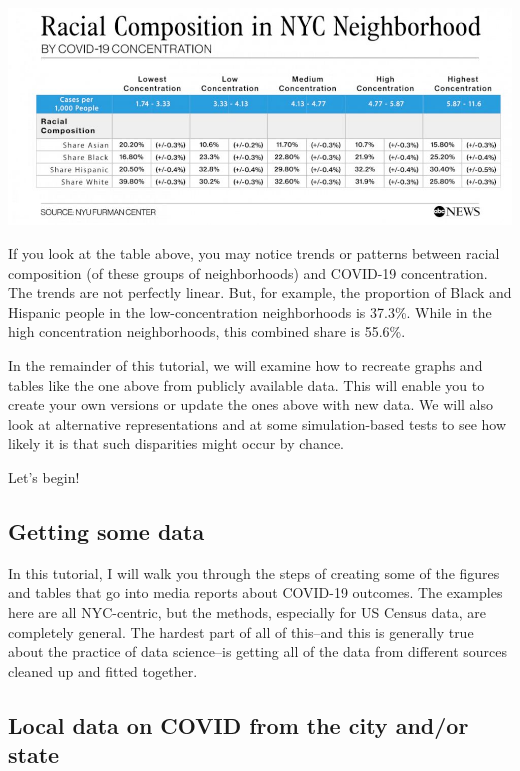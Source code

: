 \documentclass[
  openany]{book}
\begin{document}
\includegraphics{images/abc_COVID19RacialComp_v02_KA_hpEmbed_37x16_992.jpg}

If you look at the table above, you may notice trends or patterns between racial composition (of these groups of neighborhoods) and COVID-19 concentration. The trends are not perfectly linear. But, for example, the proportion of Black and Hispanic people in the low-concentration neighborhoods is 37.3\%. While in the high concentration neighborhoods, this combined share is 55.6\%.

In the remainder of this tutorial, we will examine how to recreate graphs and tables like the one above from publicly available data. This will enable you to create your own versions or update the ones above with new data. We will also look at alternative representations and at some simulation-based tests to see how likely it is that such disparities might occur by chance.

Let's begin!

\hypertarget{getting-some-data}{%
\subsection*{Getting some data}\label{getting-some-data}}

In this tutorial, I will walk you through the steps of creating some of the figures and tables that go into media reports about COVID-19 outcomes. The examples here are all NYC-centric, but the methods, especially for US Census data, are completely general. The hardest part of all of this--and this is generally true about the practice of data science--is getting all of the data from different sources cleaned up and fitted together.

\hypertarget{local-data-on-covid-from-the-city-andor-state}{%
\subsection*{Local data on COVID from the city and/or state}\label{local-data-on-covid-from-the-city-andor-state}}
\end{document}
